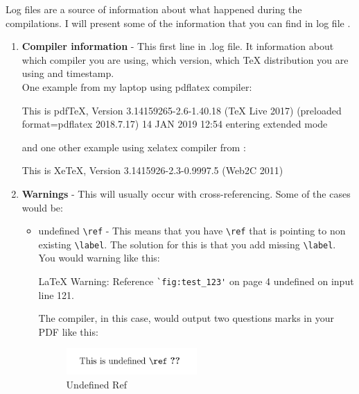 \documentclass[a4paper,oneside,8pt]{extarticle}
\newcommand{\tex}{\TeX\xspace}
\begin{document}
Log files are a source of information about what happened during the compilations.  I will present some of the information that you can find in log file \cite{understanding_the_log_file}.

\begin{enumerate}
	\item \textbf{Compiler information} - This first line in .log file. It information about which compiler you are using, which version, which \tex distribution you are using and timestamp. \\
          One example from my laptop using pdflatex compiler:\\
            \begin{markdown-block}
                This is pdfTeX, Version 3.14159265-2.6-1.40.18 (TeX Live 2017) (preloaded format=pdflatex 2018.7.17)  14 JAN 2019 12:54
                entering extended mode
            \end{markdown-block}
          and one other example using xelatex compiler from \cite{understanding_the_log_file}:
            \begin{markdown-block}
                This is XeTeX, Version 3.1415926-2.3-0.9997.5 (Web2C 2011)  
            \end{markdown-block}
    \item \textbf{Warnings} - This will usually occur with cross-referencing. Some of the cases would be:
        \begin{itemize}
            \item undefined \verb|\ref| - This means that you have \verb|\ref| that is pointing to non existing \verb|\label|. The solution for this is that you add missing \verb|\label|. \\
                You would warning like this:
                \begin{markdown-block}
                    LaTeX Warning: Reference \verb|`fig:test_123'| on page 4 undefined on input line 121.
                \end{markdown-block}

                The compiler, in this case, would output two questions marks in your PDF like this:
                \begin{figure}[h]
                    \centering
                    \includegraphics[width=0.5\textwidth]{UndefinedRef.png}
                    \caption{Undefined Ref}
                    \label{fig:UndefinedRef}
                \end{figure}


\end{itemize}
\end{enumerate}
\end{document}
